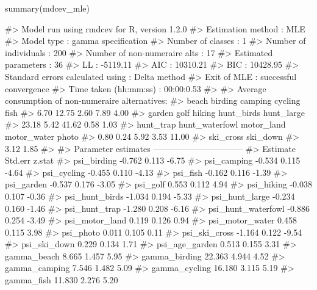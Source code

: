 \begin{Schunk}
\begin{Sinput}
summary(mdcev_mle)
\end{Sinput}
\begin{Soutput}
#> Model run using rmdcev for R, version 1.2.0 
#> Estimation method                : MLE
#> Model type                       : gamma specification
#> Number of classes                : 1
#> Number of individuals            : 200
#> Number of non-numeraire alts     : 17
#> Estimated parameters             : 36
#> LL                               : -5119.11
#> AIC                              : 10310.21
#> BIC                              : 10428.95
#> Standard errors calculated using : Delta method
#> Exit of MLE                      : successful convergence
#> Time taken (hh:mm:ss)            : 00:00:0.53
#> 
#> Average consumption of non-numeraire alternatives:
#>          beach        birding        camping        cycling           fish 
#>           6.70          12.75           2.60           7.89           4.00 
#>         garden           golf         hiking     hunt_birds     hunt_large 
#>          23.18           5.42          41.62           0.58           1.03 
#>      hunt_trap hunt_waterfowl     motor_land    motor_water          photo 
#>           0.80           0.24           5.92           3.53          11.00 
#>      ski_cross       ski_down 
#>           3.12           1.85 
#> 
#> Parameter estimates --------------------------------  
#>                      Estimate Std.err z.stat
#> psi_birding            -0.762   0.113  -6.75
#> psi_camping            -0.534   0.115  -4.64
#> psi_cycling            -0.455   0.110  -4.13
#> psi_fish               -0.162   0.116  -1.39
#> psi_garden             -0.537   0.176  -3.05
#> psi_golf                0.553   0.112   4.94
#> psi_hiking             -0.038   0.107  -0.36
#> psi_hunt_birds         -1.034   0.194  -5.33
#> psi_hunt_large         -0.234   0.160  -1.46
#> psi_hunt_trap          -1.280   0.208  -6.16
#> psi_hunt_waterfowl     -0.886   0.254  -3.49
#> psi_motor_land          0.119   0.126   0.94
#> psi_motor_water         0.458   0.115   3.98
#> psi_photo               0.011   0.105   0.11
#> psi_ski_cross          -1.164   0.122  -9.54
#> psi_ski_down            0.229   0.134   1.71
#> psi_age_garden          0.513   0.155   3.31
#> gamma_beach             8.665   1.457   5.95
#> gamma_birding          22.363   4.944   4.52
#> gamma_camping           7.546   1.482   5.09
#> gamma_cycling          16.180   3.115   5.19
#> gamma_fish             11.830   2.276   5.20

\end{Soutput}
\end{Schunk}
